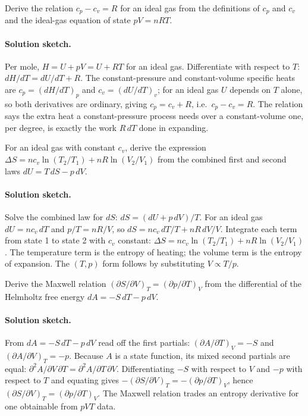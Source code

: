 \begin{exercise}
Derive the relation $c_p - c_v = R$ for an ideal gas from the
definitions of $c_p$ and $c_v$ and the ideal-gas equation of state
$pV = nRT$.
\paragraph{Solution sketch.} Per mole, $H = U + pV = U + RT$ for an
ideal gas. Differentiate with respect to $T$:
$dH/dT = dU/dT + R$. The constant-pressure and constant-volume specific
heats are $c_p = (dH/dT)_p$ and $c_v = (dU/dT)_v$; for an ideal gas $U$
depends on $T$ alone, so both derivatives are ordinary, giving
$c_p = c_v + R$, i.e.\ $c_p - c_v = R$. The relation says the extra heat
a constant-pressure process needs over a constant-volume one, per
degree, is exactly the work $R\,dT$ done in expanding.
\end{exercise}

\begin{exercise}
For an ideal gas with constant $c_v$, derive the expression $\Delta S
= n c_v \ln(T_2/T_1) + nR \ln(V_2/V_1)$ from the combined first and
second laws $dU = T\,dS - p\,dV$.
\paragraph{Solution sketch.} Solve the combined law for $dS$:
$dS = (dU + p\,dV)/T$. For an ideal gas $dU = n c_v\,dT$ and $p/T =
nR/V$, so $dS = n c_v\,dT/T + nR\,dV/V$. Integrate each term from state
1 to state 2 with $c_v$ constant:
$\Delta S = n c_v \ln(T_2/T_1) + nR \ln(V_2/V_1)$. The temperature
term is the entropy of heating; the volume term is the entropy of
expansion. The $(T,p)$ form follows by substituting $V \propto T/p$.
\end{exercise}

\begin{exercise}
Derive the Maxwell relation $(\partial S/\partial V)_T = (\partial p/
\partial T)_V$ from the differential of the Helmholtz free energy
$dA = -S\,dT - p\,dV$.
\paragraph{Solution sketch.} From $dA = -S\,dT - p\,dV$ read off the
first partials: $(\partial A/\partial T)_V = -S$ and $(\partial A/
\partial V)_T = -p$. Because $A$ is a state function, its mixed second
partials are equal: $\partial^2 A/\partial V\,\partial T = \partial^2 A/
\partial T\,\partial V$. Differentiating $-S$ with respect to $V$ and
$-p$ with respect to $T$ and equating gives $-(\partial S/\partial V)_T
= -(\partial p/\partial T)_V$, hence $(\partial S/\partial V)_T =
(\partial p/\partial T)_V$. The Maxwell relation trades an entropy
derivative for one obtainable from $pVT$ data.
\end{exercise}

